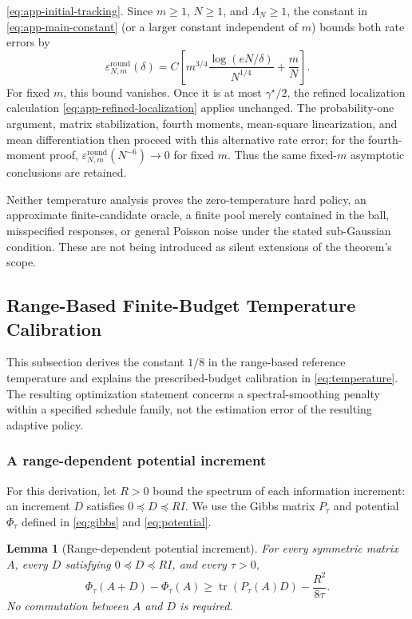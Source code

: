 \documentclass[10pt,twoside,letterpaper]{article}
\newtheorem{lemma}{Lemma}[section]
\newcommand{\tr}{\operatorname{tr}}
\begin{document}
\eqref{eq:app-initial-tracking}. Since $m\ge1$, $N\ge1$, and
$\Lambda_N\ge1$, the constant in \eqref{eq:app-main-constant}
(or a larger constant independent of $m$) bounds both rate errors by
\begin{equation}
\varepsilon^{\mathrm{round}}_{N,m}(\delta)
=C\left[m^{3/4}\frac{\log(eN/\delta)}{N^{1/4}}+\frac mN\right].
\label{eq:app-old-schedule-bound}
\end{equation}
For fixed $m$, this bound vanishes. Once it is at most
$\gamma^\star/2$, the refined localization calculation
\eqref{eq:app-refined-localization} applies unchanged. The
probability-one argument, matrix stabilization, fourth moments,
mean-square linearization, and mean differentiation then proceed
with this alternative rate error; for the fourth-moment proof,
$\varepsilon^{\mathrm{round}}_{N,m}(N^{-6})\to0$ for fixed $m$.
Thus the same fixed-$m$ asymptotic conclusions are retained.

Neither temperature analysis proves the zero-temperature hard policy,
an approximate finite-candidate oracle, a finite pool merely contained
in the ball, misspecified responses, or general Poisson noise under
the stated sub-Gaussian condition. These are not being introduced as
silent extensions of the theorem's scope.

\subsection{Range-Based Finite-Budget Temperature Calibration}
\label{app:range-calibration}

This subsection derives the constant $1/8$ in the range-based
reference temperature and explains the prescribed-budget calibration
in \eqref{eq:temperature}. The resulting optimization statement
concerns a spectral-smoothing penalty within a specified schedule
family, not the estimation error of the resulting adaptive policy.

\subsubsection{A range-dependent potential increment}

For this derivation, let $R>0$ bound the spectrum of each information
increment: an increment $D$ satisfies $0\preceq D\preceq RI$.
We use the Gibbs matrix $P_\tau$ and potential $\Phi_\tau$ defined
in \eqref{eq:gibbs} and \eqref{eq:potential}.

\begin{lemma}[Range-dependent potential increment]
\label{lem:range-potential-increment}
For every symmetric matrix $A$, every $D$ satisfying
$0\preceq D\preceq RI$, and every $\tau>0$,
\begin{equation}
\Phi_\tau(A+D)-\Phi_\tau(A)
\ge
\tr\!\left(P_\tau(A)D\right)-\frac{R^2}{8\tau}.
\label{eq:range-potential-increment}
\end{equation}
No commutation between $A$ and $D$ is required.
\end{lemma}
\end{document}
